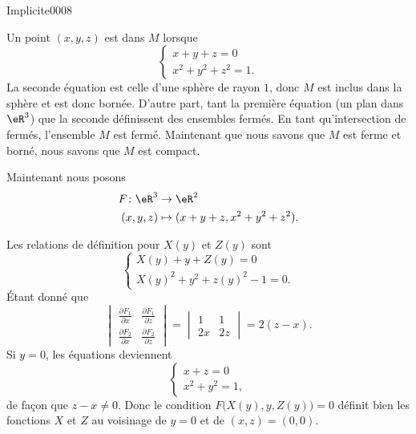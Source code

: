 
\begin{corrige}{Implicite0008}

	Un point $(x,y,z)$ est dans $M$ lorsque
	\begin{equation}
		\left\{
		\begin{array}{ll}
			x+y+z=0\\
			x^2+y^2+z^2=1.
		\end{array}
		\right.
	\end{equation}
	La seconde équation est celle d'une sphère de rayon $1$, donc $M$ est inclus dans la sphère et est donc bornée. D'autre part, tant la première équation (un plan dans $\eR^3$) que la seconde définissent des ensembles fermés. En tant qu'intersection de fermés, l'ensemble $M$ est fermé. Maintenant que nous savons que $M$ est ferme et borné, nous savons que $M$ est compact.

	Maintenant nous posons
	\begin{equation}
		\begin{aligned}
			F\colon \eR^3&\to \eR^2 \\
			(x,y,z)&\mapsto (x+y+z,x^2+y^2+z^2). 
		\end{aligned}
	\end{equation}

	Les relations de définition pour $X(y)$ et $Z(y)$ sont
	\begin{equation}			\label{EqHuitEqsqDefXZ}
		\left\{
		\begin{array}{ll}
			X(y)+y+Z(y)=0\\
			X(y)^2+y^2+z(y)^2-1=0.
		\end{array}
		\right.
	\end{equation}
	Étant donné que
	\begin{equation}
		\begin{vmatrix}
			\frac{ \partial F_1 }{ \partial x }	&	\frac{ \partial F_1 }{ \partial z }	\\ 
			\frac{ \partial F_2 }{ \partial x }	&	\frac{ \partial F_2 }{ \partial z }	
		\end{vmatrix}
		=
		\begin{vmatrix}
			1	&	1	\\ 
			2x	&	2z	
		\end{vmatrix}
		=
		2(z-x).
	\end{equation}
	Si $y=0$, les équations deviennent
	\begin{equation}
		\left\{
		\begin{array}{ll}
			x+z=0\\
			x^2+y^2=1,
		\end{array}
		\right.
	\end{equation}
	de façon que $z-x\neq 0$. Donc le condition \( F\big( X(y), y, Z(y) \big)=0\) définit bien les fonctions \( X\) et \( Z\) au voisinage de $y=0$ et de $(x,z)=(0,0)$.


\end{corrige}
